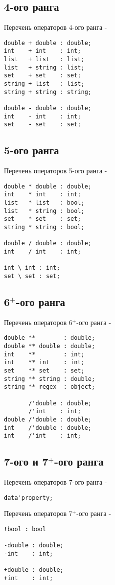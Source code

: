 \subsection{4-ого ранга}

\noindent Перечень операторов 4-ого ранга -
\begin{lstlisting}[numbers=none]
double + double : double;
int    + int    : int;
list   + list   : list;
list   + string : list;
set    + set    : set;
string + list   : list;
string + string : string;

double - double : double;
int    - int    : int;
set    - set    : set;
\end{lstlisting}

\subsection{5-ого ранга}

\noindent Перечень операторов 5-ого ранга -
\begin{lstlisting}[numbers=none]
double * double : double;
int    * int    : int;
list   * list   : bool;
list   * string : bool;
set    * set    : set;
string * string : bool;

double / double : double;
int    / int    : int;

int \ int : int;
set \ set : set;
\end{lstlisting}

\subsection{6$^+$-ого ранга}

\noindent Перечень операторов 6$^+$-ого ранга -
\begin{lstlisting}[numbers=none]
double **        : double;
double ** double : double;
int    **        : int;
int    ** int    : int;
set    ** set    : set;
string ** string : double;
string ** regex  : object;

       /'double : double;
       /'int    : int;
double /'double : double;
int    /'double : double;
int    /'int    : int;
\end{lstlisting}

\subsection{7-ого и 7$^+$-ого ранга}

\noindent Перечень операторов 7-ого ранга -
\begin{lstlisting}[numbers=none]
data'property;
\end{lstlisting}

\noindent Перечень операторов 7$^+$-ого ранга -
\begin{lstlisting}[numbers=none]
!bool : bool

-double : double;
-int    : int;

+double : double;
+int    : int;
\end{lstlisting}

